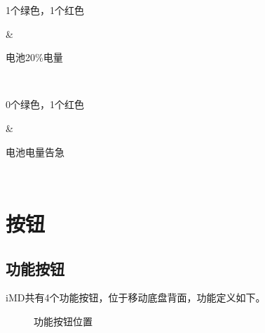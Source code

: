 \documentclass[a4paper,11pt,english,openany,oneside]{sphinxmanual}
\begin{document}
\begin{savenotes}
\begin{tabular}[t]{}
\sphinxhline\begin{varwidth}[t]{}
\sphinxAtStartPar
1个绿色，1个红色
\sphinxbeforeendvarwidth
\end{varwidth}%
&\begin{varwidth}[t]{}
\sphinxAtStartPar
电池20\%电量
\sphinxbeforeendvarwidth
\end{varwidth}%
\\
\sphinxhline\begin{varwidth}[t]{}
\sphinxAtStartPar
0个绿色，1个红色
\sphinxbeforeendvarwidth
\end{varwidth}%
&\begin{varwidth}[t]{}
\sphinxAtStartPar
电池电量告急
\sphinxbeforeendvarwidth
\end{varwidth}%
\\
\sphinxbottomrule
\end{tabular}
\sphinxtableafterendhook\par
\sphinxattableend\end{savenotes}


\section{按钮}
\label{\detokenize{07 _u6280_u672f_u89c4_u683c:id20}}\label{\detokenize{07 _u6280_u672f_u89c4_u683c:id21}}

\subsection{功能按钮}
\label{\detokenize{07 _u6280_u672f_u89c4_u683c:id22}}\label{\detokenize{07 _u6280_u672f_u89c4_u683c:id23}}
\sphinxAtStartPar
iM\sphinxhyphen{}D共有4个功能按钮，位于移动底盘背面，功能定义如下。

\begin{figure}[H]
\centering
\capstart

\noindent{}
\caption{功能按钮位置}\label{\detokenize{07 _u6280_u672f_u89c4_u683c:id55}}\end{figure}
\end{document}
